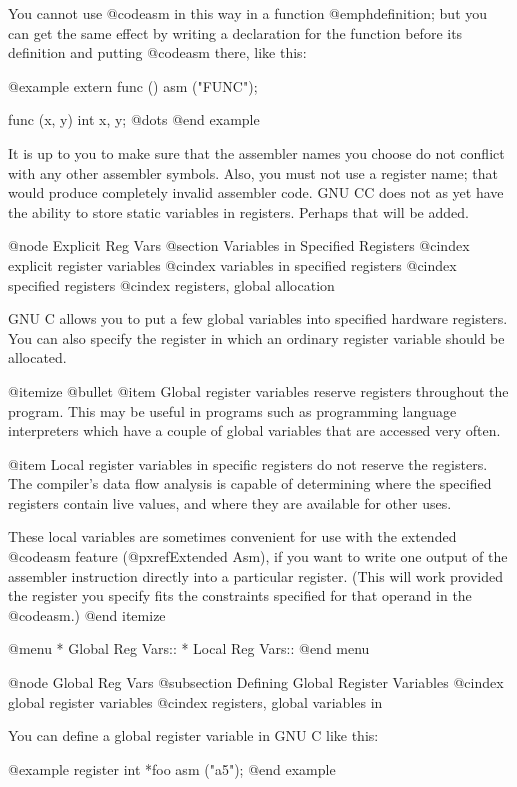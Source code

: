 {{{You cannot use @code{asm} in this way in a function @emph{definition}; but
you can get the same effect by writing a declaration for the function
before its definition and putting @code{asm} there, like this:

@example
extern func () asm ("FUNC");

func (x, y)
     int x, y;
@dots{}
@end example

It is up to you to make sure that the assembler names you choose do not
conflict with any other assembler symbols.  Also, you must not use a
register name; that would produce completely invalid assembler code.  GNU
CC does not as yet have the ability to store static variables in registers.
Perhaps that will be added.

@node Explicit Reg Vars
@section Variables in Specified Registers
@cindex explicit register variables
@cindex variables in specified registers
@cindex specified registers
@cindex registers, global allocation

GNU C allows you to put a few global variables into specified hardware
registers.  You can also specify the register in which an ordinary
register variable should be allocated.

@itemize @bullet
@item
Global register variables reserve registers throughout the program.
This may be useful in programs such as programming language
interpreters which have a couple of global variables that are accessed
very often.

@item
Local register variables in specific registers do not reserve the
registers.  The compiler's data flow analysis is capable of determining
where the specified registers contain live values, and where they are
available for other uses.

These local variables are sometimes convenient for use with the extended
@code{asm} feature (@pxref{Extended Asm}), if you want to write one
output of the assembler instruction directly into a particular register.
(This will work provided the register you specify fits the constraints
specified for that operand in the @code{asm}.)
@end itemize

@menu
* Global Reg Vars::
* Local Reg Vars::
@end menu

@node Global Reg Vars
@subsection Defining Global Register Variables
@cindex global register variables
@cindex registers, global variables in

You can define a global register variable in GNU C like this:

@example
register int *foo asm ("a5");
@end example

}}}
